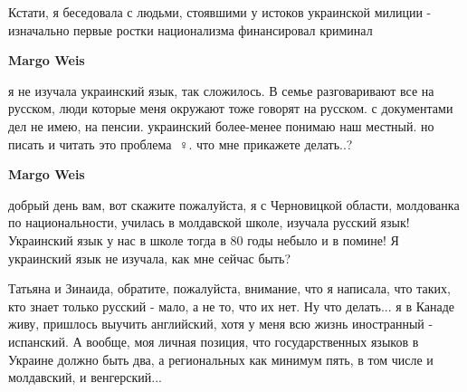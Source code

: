 \begin{itemize}
\begin{itemize}
 

Кстати, я беседовала с людьми, стоявшими у истоков украинской милиции -
изначально первые ростки национализма финансировал криминал


 
\textbf{Margo Weis} 

я не изучала украинский язык, так сложилось. В семье
разговаривают все на русском, люди которые меня окружают тоже говорят на
русском. с документами дел не имею, на пенсии. украинский более-менее понимаю наш
местный. но писать и читать это проблема 🤦♀️. что мне прикажете делать..?

 
\textbf{Margo Weis} 

добрый день вам, вот скажите пожалуйста, я с Черновицкой области, молдованка по
национальности, училась в молдавской школе, изучала русский язык! Украинский
язык у нас в школе тогда в 80 годы небыло и в помине! Я украинский язык не
изучала, как мне сейчас быть?


 

Татьяна и Зинаида, обратите, пожалуйста, внимание, что я написала, что таких,
кто знает только русский - мало, а не то, что их нет. Ну что делать... я в
Канаде живу, пришлось выучить английский, хотя у меня всю жизнь иностранный -
испанский. А вообще, моя личная позиция, что государственных языков в Украине
должно быть два, а региональных как минимум пять, в том числе и молдавский, и
венгерский...

\end{itemize}


\end{itemize}
